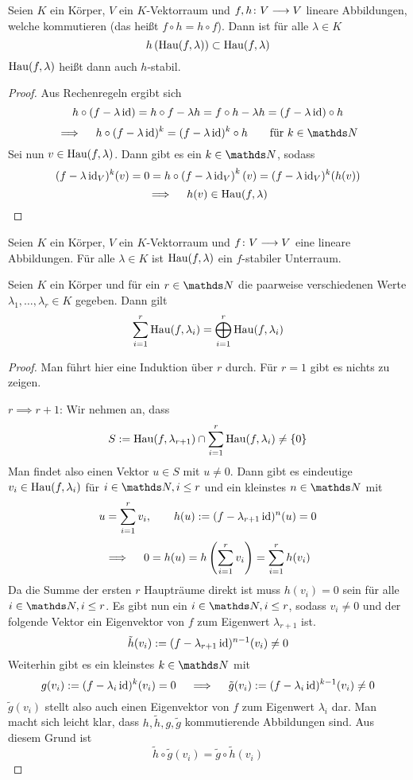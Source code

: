 		\begin{lemma}
			Seien $K$ ein Körper, $V$ ein $K$-Vektorraum und $f,h\colon V\longrightarrow V$ lineare Abbildungen, welche kommutieren (das heißt $f\circ h = h\circ f$).
			Dann ist für alle $\lambda\in K$
			\[ h\left(  \mathrm{Hau}(f,\lambda)  \right) \subset \mathrm{Hau}(f,\lambda) \]
			$\mathrm{Hau}(f,\lambda)$ heißt dann auch $h$-stabil.
		\end{lemma}
		\begin{proof}
			Aus Rechenregeln ergibt sich
			\[ h\circ (f-\lambda\operatorname{id}) = h\circ f - \lambda h = f\circ h - \lambda h = \left(  f - \lambda\operatorname{id}  \right)\circ h \]
			\[ \implies \quad h\circ (f-\lambda\id)^k = (f-\lambda\id)^k\circ h \qquad \text{für } k\in\SN \]
			Sei nun $v\in\mathrm{Hau}(f,\lambda)$. Dann gibt es ein $k\in\SN$, sodass
			\[ (f-\lambda\operatorname{id}_V)^k(v) = 0 = h\circ\left( f-\lambda\operatorname{id}_V \right)^k(v) = (f-\lambda\operatorname{id}_V)^k(h(v)) \]
			\[ \implies \quad h(v)\in\mathrm{Hau}(f,\lambda) \]
		\end{proof}

		\begin{corollary}
			Seien $K$ ein Körper, $V$ ein $K$-Vektorraum und $f\colon V\longrightarrow V$ eine lineare Abbildungen.
			Für alle $\lambda\in K$ ist $\mathrm{Hau}(f,\lambda)$ ein $f$-stabiler Unterraum.
		\end{corollary}

		\begin{theorem}
			Seien $K$ ein Körper und für ein $r\in\SN$ die paarweise verschiedenen Werte $\lambda_1,\ldots,\lambda_r\in K$ gegeben.
			Dann gilt
			\[ \sum_{i=1}^r \mathrm{Hau}(f,\lambda_i) = \bigoplus_{i=1}^r \mathrm{Hau}(f,\lambda_i) \]
		\end{theorem}
		\begin{proof}
			Man führt hier eine Induktion über $r$ durch.
			Für $r=1$ gibt es nichts zu zeigen.

			$r\implies r+1$:
			Wir nehmen an, dass
			\[ S:=\mathrm{Hau}(f,\lambda_{r+1}) \cap \sum_{i=1}^r \mathrm{Hau}(f,\lambda_i) \neq \left\{ 0 \right\} \]
			Man findet also einen Vektor $u\in S$ mit $u\neq 0$.
			Dann gibt es eindeutige $v_i\in\mathrm{Hau}(f,\lambda_i)$ für $i\in\SN,i\leq r$ und ein kleinstes $n\in\SN$ mit
			\[ u = \sum_{i=1}^r v_i,\qquad h(u):=(f-\lambda_{r+1}\operatorname{id})^n(u)=0 \]
			\[ \implies \quad 0 = h(u) = h\left( \sum_{i=1}^r v_i \right) = \sum_{i=1}^r h(v_i) \]
			Da die Summe der ersten $r$ Haupträume direkt ist muss $h(v_i)=0$ sein für alle $i\in\SN,i\leq r$.
			Es gibt nun ein $i\in\SN,i\leq r$, sodass $v_i\neq 0$ und der folgende Vektor ein Eigenvektor von $f$ zum Eigenwert $\lambda_{r+1}$ ist.
			\[ \tilde{h}(v_i) := (f-\lambda_{r+1}\operatorname{id})^{n-1}(v_i) \neq 0 \]
			Weiterhin gibt es ein kleinstes $k\in\SN$ mit
			\[ g(v_i) := (f-\lambda_i\operatorname{id})^k(v_i) = 0 \quad \implies \quad \tilde{g}(v_i):=(f-\lambda_i\operatorname{id})^{k-1}(v_i)\neq 0 \]
			$\tilde{g}(v_i)$ stellt also auch einen Eigenvektor von $f$ zum Eigenwert $\lambda_i$ dar.
			Man macht sich leicht klar, dass $h,\tilde{h},g,\tilde{g}$ kommutierende Abbildungen sind.
			Aus diesem Grund ist
			\[ \tilde{h}\circ\tilde{g}(v_i) = \tilde{g}\circ\tilde{h}(v_i) \]
		\end{proof}

